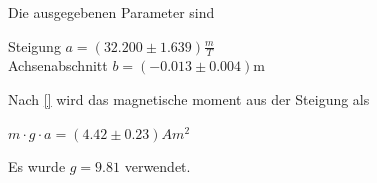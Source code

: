 Die ausgegebenen Parameter sind\\
\begin{centering}
  Steigung $a = (32.200 ± 1.639) \frac{m}{T}$\\
  Achsenabschnitt $b = (-0.013 ± 0.004)$m\\
\end{centering}

Nach \ref{} wird das magnetische moment aus der Steigung als\\
\begin{centering}
  $m \cdot g \cdot a = (4.42 \pm 0.23) Am^2$\\
\end{centering}
Es wurde $g = 9.81$ verwendet. %


